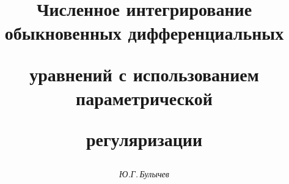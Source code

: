 

 




 




\newcommand{\re}{\operatorname{Re}} 


\newcommand{\up}[2]{\overset{#1}{#2}{}} 


\newcommand{\tts}[1]{} 


 




\setcounter{page}{7} 












 


\author{\it Ю.Г.\,Булычев} 




\title{Численное интегрирование обыкновенных дифференциальных  


уравнений с использованием параметрической  


регуляризации} 


 


\date{} 




\pagestyle{plain} %


 


